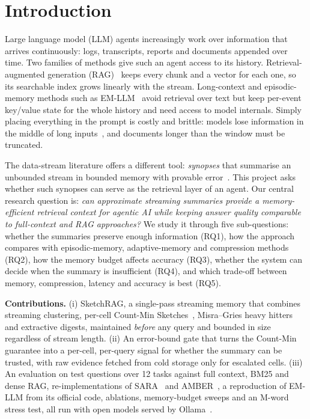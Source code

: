 \documentclass[conference,10pt]{IEEEtran}
\begin{document}
\section{Introduction}
Large language model (LLM) agents increasingly work over information that arrives continuously: logs, transcripts,
reports and documents appended over time. Two families of methods give such an agent access to its history.
Retrieval-augmented generation (RAG)~\cite{lewis2020rag} keeps every chunk and a vector for each one, so its searchable
index grows linearly with the stream. Long-context and episodic-memory methods such as EM-LLM~\cite{fountas2025emllm}
avoid retrieval over text but keep per-event key/value state for the whole history and need access to model
internals. Simply placing everything in the prompt is costly and brittle: models lose information in the middle of
long inputs~\cite{liu2024lost}, and documents longer than the window must be truncated.

The data-stream literature offers a different tool: \emph{synopses} that summarise an unbounded stream in bounded
memory with provable error~\cite{muthukrishnan2005streams}. This project asks whether such synopses can serve as the
retrieval layer of an agent. Our central research question is: \emph{can approximate streaming summaries provide a
memory-efficient retrieval context for agentic AI while keeping answer quality comparable to full-context and RAG
approaches?} We study it through five sub-questions: whether the summaries preserve enough information (RQ1), how the
approach compares with episodic-memory, adaptive-memory and compression methods (RQ2), how the memory budget affects
accuracy (RQ3), whether the system can decide when the summary is insufficient (RQ4), and which trade-off between
memory, compression, latency and accuracy is best (RQ5).

\textbf{Contributions.} (i) SketchRAG, a single-pass streaming memory that combines streaming clustering, per-cell
Count-Min Sketches~\cite{cormode2005countmin}, Misra--Gries heavy hitters~\cite{misra1982repeated} and extractive
digests, maintained \emph{before} any query and bounded in size regardless of stream length. (ii) An error-bound gate
that turns the Count-Min guarantee into a per-cell, per-query signal for whether the summary can be trusted, with
raw evidence fetched from cold storage only for escalated cells. (iii) An evaluation on \NQ{} test questions over 12
tasks against full context, BM25 and dense RAG, re-implementations of SARA~\cite{jin2026sara} and
AMBER~\cite{qin2025amber}, a reproduction of EM-LLM from its official code, ablations, memory-budget sweeps and an
\StressMWords{}M-word stress test, all run with open models served by Ollama~\cite{ollama}.
\end{document}
